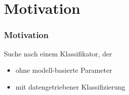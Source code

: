 \section{Motivation}

\begin{frame}
	\frametitle{Motivation}
	Suche nach einem Klassifikator, der
	\begin{itemize}
		\item ohne modell-basierte Parameter
		\item mit datengetriebener Klassifizierung
	\end{itemize}


\end{frame}
